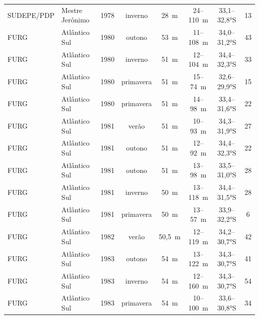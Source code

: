 \documentclass[a4paper,11pt,twoside,showtrims,onecolumn,openright,final]{memoir}
\begin{document}
\begin{table}
\begin{tiny}
\begin{tabular*}{\textwidth}{l@{\extracolsep{\fill}}lcccccc}
 SUDEPE/PDP	&	Mestre Jerônimo  & 1978 &         inverno &      28~m &      24--110~m &   33,1--32,8°S &          13 	\\
 FURG		&	Atlântico Sul    & 1980 &         outono &      53~m &      11--108~m &   34,0--31,2°S &          43 	\\
 FURG		&	Atlântico Sul    & 1980 &         inverno &      51~m &      12--104~m &   34,4--32,3°S &          33 	\\
 FURG		&	Atlântico Sul    & 1980 &         primavera &      51~m &      15--74~m &   32,6--29,9°S &          15 	\\
 FURG		&	Atlântico Sul    & 1980 &         primavera &      51~m &      14--98~m &   33,4--31,6°S &          22 		\\
 FURG		&	Atlântico Sul    & 1981 &         verão &      51~m &      10--93~m &   34,3--31,9°S &          27 	\\
 FURG		&	Atlântico Sul    & 1981 &         outono &      51~m &      12--92~m &   34,4--32,3°S &          22 	\\
 FURG		&	Atlântico Sul    & 1981 &         outono &      51~m &      13--98~m &   33,5--31,0°S &          28 	\\
 FURG		&	Atlântico Sul    & 1981 &         inverno &      50~m &      13--118~m &   34,4--31,5°S &          28 	\\
 FURG		&	Atlântico Sul    & 1981 &         primavera &      50~m &      13--57~m &   33,9--32,2°S &           6 	\\
 FURG		&	Atlântico Sul    & 1982 &         verão &    50,5~m &      12--119~m &   34,2--30,7°S &          42 	\\
 FURG		&	Atlântico Sul    & 1983 &         outono &      54~m &      13--122~m &   34,3--30,7°S &          41 	\\
 FURG		&	Atlântico Sul    & 1983 &         inverno &      54~m &      12--160~m &   34,3--30,7°S &          54 	\\
 FURG		&	Atlântico Sul    & 1983 &         primavera &      54~m &      10--100~m &   33,6--30,8°S &          34 	\\
\bottomrule
\end{tabular*}
\end{tiny}
\end{table}

 
\end{document}
